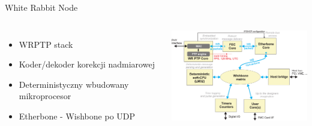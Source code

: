 \documentclass[compress,red]{beamer}
\begin{document}
\begin{frame}{White Rabbit Node}

  \begin{columns}[c]

  \begin{itemize}
    \item WRPTP stack
    \item Koder/dekoder korekcji nadmiarowej
    \item Deterministyczny wbudowany mikroprocesor
    \item Etherbone - Wishbone po UDP
  \end{itemize}



    \begin{center}
    \includegraphics[width=7.0cm]{node/wr_node_block.pdf}
    \end{center}


  \end{columns}



\end{frame}
\end{document}
